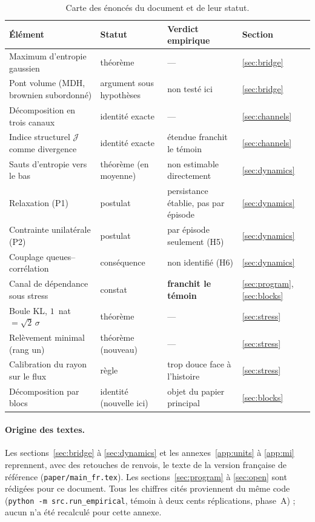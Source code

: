 \documentclass[11pt]{article}
\theoremstyle{definition}
\theoremstyle{remark}
\newcommand{\JJ}{\mathcal{J}}
\begin{document}
\begin{table}[htbp]
\centering
\small
\begin{tabular}{@{}p{5.0cm}p{3.0cm}p{4.6cm}l@{}}
\toprule
Élément & Statut & Verdict empirique & Section \\
\midrule
Maximum d'entropie gaussien & théorème & --- & \ref{sec:bridge} \\
Pont volume (MDH, brownien subordonné) & argument sous hypothèses & non testé ici & \ref{sec:bridge} \\
Décomposition en trois canaux & identité exacte & --- & \ref{sec:channels} \\
Indice structurel $\JJ$ comme divergence & identité exacte & étendue franchit le témoin & \ref{sec:channels} \\
Sauts d'entropie vers le bas & théorème (en moyenne) & non estimable directement & \ref{sec:dynamics} \\
Relaxation (P1) & postulat & persistance établie, pas par épisode & \ref{sec:dynamics} \\
Contrainte unilatérale (P2) & postulat & par épisode seulement (H5) & \ref{sec:dynamics} \\
Couplage queues--corrélation & conséquence & non identifié (H6) & \ref{sec:dynamics} \\
Canal de dépendance sous stress & constat & \textbf{franchit le témoin} & \ref{sec:program}, \ref{sec:blocks} \\
Boule KL, $1$~nat $=\sqrt2\,\sigma$ & théorème & --- & \ref{sec:stress} \\
Relèvement minimal (rang un) & théorème (nouveau) & --- & \ref{sec:stress} \\
Calibration du rayon sur le flux & règle & trop douce face à l'histoire & \ref{sec:stress} \\
Décomposition par blocs & identité (nouvelle ici) & objet du papier principal & \ref{sec:blocks} \\
\bottomrule
\end{tabular}
\caption{Carte des énoncés du document et de leur statut.}
\label{tab:statut}
\end{table}

\paragraph{Origine des textes.} Les sections~\ref{sec:bridge} à
\ref{sec:dynamics} et les annexes~\ref{app:units} à \ref{app:mi} reprennent, avec
des retouches de renvois, le texte de la version française de référence
(\texttt{paper/main\_fr.tex}). Les sections~\ref{sec:program} à
\ref{sec:open} sont rédigées pour ce document. Tous les chiffres cités
proviennent du même code (\texttt{python -m src.run\_empirical}, témoin à
deux cents réplications, phase~A) ; aucun n'a été recalculé pour cette annexe.
\end{document}

